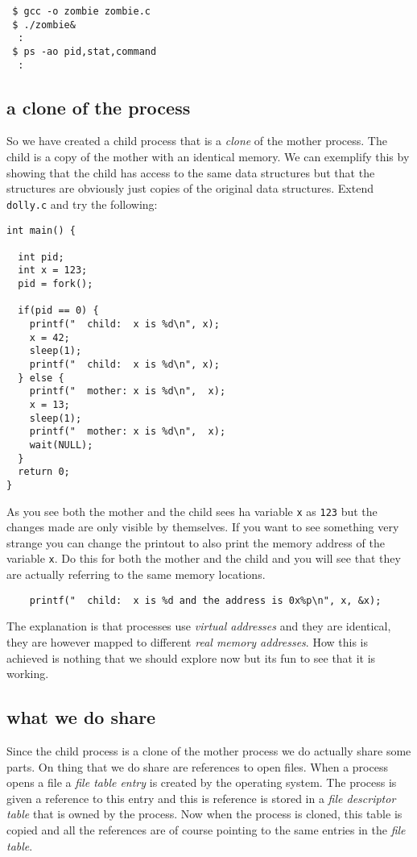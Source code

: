 \documentclass[a4paper,11pt]{article}
\begin{document}
\begin{verbatim}
 $ gcc -o zombie zombie.c
 $ ./zombie&
  :
 $ ps -ao pid,stat,command
  :
\end{verbatim}

\subsection{a clone of the process}

So we have created a child process that is a {\em clone} of the mother
process. The child is a copy of the mother with an identical
memory. We can exemplify this by showing that the child has access to
the same data structures but that the structures are obviously just
copies of the original data structures. Extend {\tt dolly.c} and try
the following:

\begin{lstlisting}
int main() {

  int pid;
  int x = 123;
  pid = fork();

  if(pid == 0) {
    printf("  child:  x is %d\n", x);
    x = 42;
    sleep(1);
    printf("  child:  x is %d\n", x);
  } else {
    printf("  mother: x is %d\n",  x);
    x = 13;
    sleep(1);
    printf("  mother: x is %d\n",  x);
    wait(NULL);
  }
  return 0;
}
\end{lstlisting}

As you see both the mother and the child sees ha variable {\tt x} as
{\tt 123} but the changes made are only visible by themselves. If you
want to see something very strange you can change the printout to also
print the memory address of the variable {\tt x}. Do this for both the
mother and the child and you will see that they are actually referring
to the same memory locations. 

\begin{lstlisting}
    printf("  child:  x is %d and the address is 0x%p\n", x, &x);  
\end{lstlisting}

The explanation is that processes use {\em virtual addresses} and they
are identical, they are however mapped to different {\em real memory
  addresses}. How this is achieved is nothing that we should explore
now but its fun to see that it is working. 

\subsection{what we do share}

Since the child process is a clone of the mother process we do
actually share some parts. On thing that we do share are references to
open files. When a process opens a file a {\em file table entry} is
created by the operating system. The process is given a reference to
this entry and this is reference is stored in a {\em file descriptor
  table} that is owned by the process. Now when the process is
cloned, this table is copied and all the references are of course
pointing to the same entries in the {\em file table}. 
\end{document}
